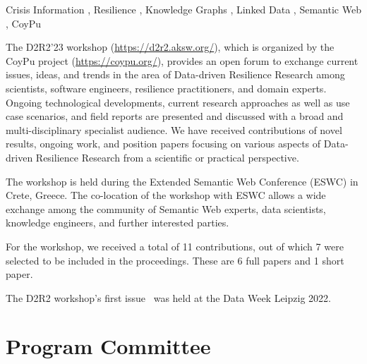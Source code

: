 \documentclass{ceurart}
\begin{document}
\begin{keywords}
  Crisis Information \sep
  Resilience \sep
  Knowledge Graphs \sep
  Linked Data \sep
  Semantic Web \sep
  CoyPu
\end{keywords}

\maketitle


The D2R2’23 workshop (\url{https://d2r2.aksw.org/}), which is organized by the CoyPu project (\url{https://coypu.org/}), provides an open forum to exchange current issues, ideas, and trends in the area of Data-driven Resilience Research among scientists, software engineers, resilience practitioners, and domain experts. Ongoing technological developments, current research approaches as well as use case scenarios, and field reports are presented and discussed with a broad and multi-disciplinary specialist audience. We have received contributions of novel results, ongoing work, and position papers focusing on various aspects of Data-driven Resilience Research from a scientific or practical perspective.

The workshop is held during the Extended Semantic Web Conference (ESWC) in Crete, Greece.
The co-location of the workshop with ESWC allows a wide exchange among the community of Semantic Web experts, data scientists, knowledge engineers, and further interested parties.

For the workshop, we received a total of 11 contributions, out of which 7 were selected to be included in the proceedings. These are 6 full papers and 1 short paper.

The D2R2 workshop's first issue~\cite{D2R2-22} was held at the Data Week Leipzig 2022.

\section*{Program Committee}
\end{document}
